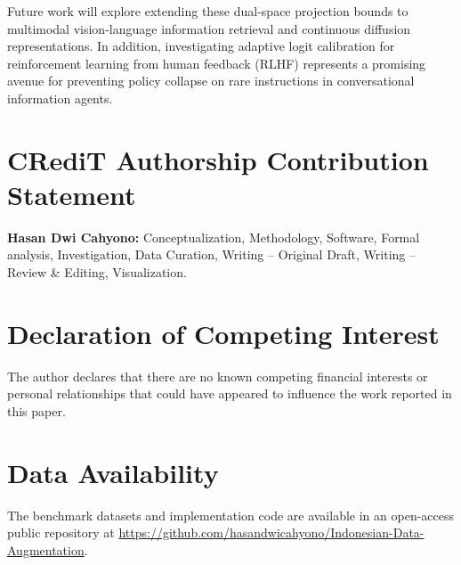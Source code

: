 \documentclass[final,5p,times,twocolumn]{elsarticle}
\begin{document}
Future work will explore extending these dual-space projection bounds to multimodal vision-language information retrieval and continuous diffusion representations. In addition, investigating adaptive logit calibration for reinforcement learning from human feedback (RLHF) represents a promising avenue for preventing policy collapse on rare instructions in conversational information agents.

\section*{CRediT Authorship Contribution Statement}
\textbf{Hasan Dwi Cahyono:} Conceptualization, Methodology, Software, Formal analysis, Investigation, Data Curation, Writing -- Original Draft, Writing -- Review \& Editing, Visualization.

\section*{Declaration of Competing Interest}
The author declares that there are no known competing financial interests or personal relationships that could have appeared to influence the work reported in this paper.

\section*{Data Availability}
The benchmark datasets and implementation code are available in an open-access public repository at \url{https://github.com/hasandwicahyono/Indonesian-Data-Augmentation}.



\end{document}
